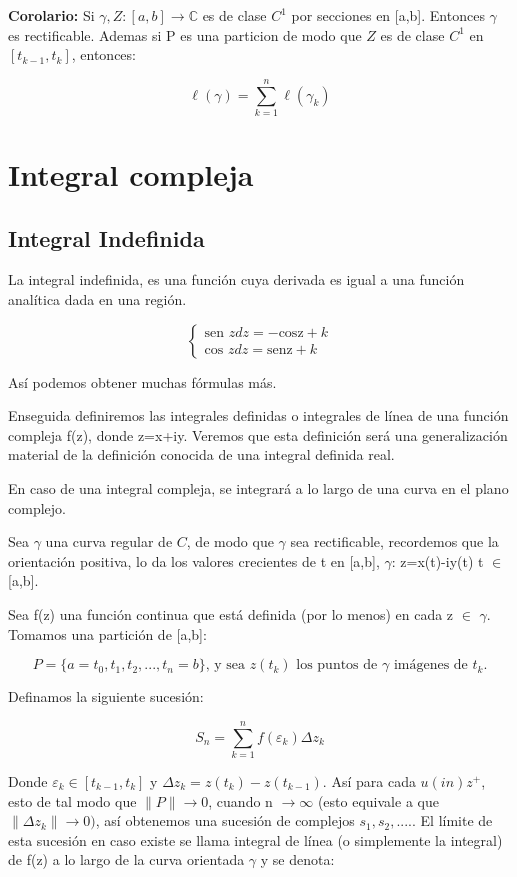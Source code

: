 \documentclass[a4paper,12pt]{article}
\begin{document}
\textbf{Corolario:} Si \(\gamma, Z: [a,b] \rightarrow \mathbb{C}\) es de clase \(C^1\) por secciones en [a,b]. Entonces \(\gamma\) es rectificable. Ademas si P es una particion de modo que \(Z\) es de clase \(C^1\) en \([t_{k-1}, t_k]\), entonces:

\[
\ell(\gamma) = \sum_{k=1}^n \ell(\gamma_k)
\]
\newpage
\section{Integral compleja}
\subsection{Integral Indefinida}
La integral indefinida, es una función cuya derivada es igual a una función analítica dada en una región.

\[
\begin{cases}
\text{sen } z dz = -\text{cosz} + k \\
\text{cos } z dz = \text{senz} + k
\end{cases}
\]

Así podemos obtener muchas fórmulas más.

Enseguida definiremos las integrales definidas o integrales de línea de una función compleja f(z), donde z=x+iy. Veremos que esta definición será una generalización material de la definición conocida de una integral definida real.

En caso de una integral compleja, se integrará a lo largo de una curva en el plano complejo.

Sea \(\gamma\) una curva regular de \(C\), de modo que \(\gamma\) sea rectificable, recordemos que la orientación positiva, lo da los valores crecientes de t en [a,b], \(\gamma\): z=x(t)-iy(t) t \(\in\) [a,b].

Sea f(z) una función continua que está definida (por lo menos) en cada z \(\in\) \(\gamma\). Tomamos una partición de [a,b]:

\[
P=\{a=t_0,t_1,t_2,...,t_n=b\} \text{, y sea } z(t_k) \text{ los puntos de } \gamma \text{ imágenes de } t_k.
\]

Definamos la siguiente sucesión:

\[
S_n = \sum_{k=1}^n f(\varepsilon_k) \Delta z_k
\]

Donde \( \varepsilon_k \in \left[ t_{k-1}, t_k \right] \) y \(\Delta z_k = z(t_k) - z(t_{k-1})\). Así para cada $u (in) z^{+}$, esto de tal modo que \(\|P\| \rightarrow 0\), cuando n \(\rightarrow \infty\) (esto equivale a que \(\|\Delta z_k\| \rightarrow 0)\), así obtenemos una sucesión de complejos \(s_1, s_2,....\). El límite de esta sucesión en caso existe se llama integral de línea (o simplemente la integral) de f(z) a lo largo de la curva orientada \(\gamma\) y se denota:
\end{document}
